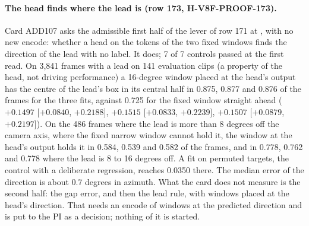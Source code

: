 \paragraph{The head finds where the lead is (row 173, H-V8F-PROOF-173).} Card ADD107 asks the admissible first half of the lever of row 171 at , with no new encode: whether a head on the tokens of the two fixed windows finds the direction of the lead with no label. It does; 7 of 7 controls passed at the first read. On 3,841 frames with a lead on 141 evaluation clips (a property of the head, not driving performance) a 16-degree window placed at the head's output has the centre of the lead's box in its central half in 0.875, 0.877 and 0.876 of the frames for the three fits, against 0.725 for the fixed window straight ahead ($+0.1497$ [$+0.0840$, $+0.2188$], $+0.1515$ [$+0.0833$, $+0.2239$], $+0.1507$ [$+0.0879$, $+0.2197$]). On the 486 frames where the lead is more than 8 degrees off the camera axis, where the fixed narrow window cannot hold it, the window at the head's output holds it in 0.584, 0.539 and 0.582 of the frames, and in 0.778, 0.762 and 0.778 where the lead is 8 to 16 degrees off. A fit on permuted targets, the control with a deliberate regression, reaches 0.0350 there. The median error of the direction is about 0.7 degrees in azimuth. What the card does not measure is the second half: the gap error, and then the lead rule, with windows placed at the head's direction. That needs an encode of windows at the predicted direction and is put to the PI as a decision; nothing of it is started.

